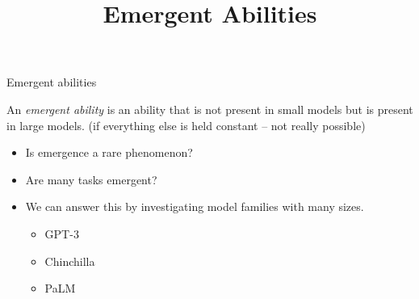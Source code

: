 



\newcommand{\learninggoals}{
\item illustrate emergent abilities that LLMs reveal when they are scaled up
\item discuss a counterargument for the concept of emergence
}

\def\myblue#1{\textcolor{texblue}{#1}}

\title{Emergent Abilities}
\date{}




\begin{vbframe}{Emergent abilities}

\vfill

An \textit{emergent ability} is an ability that is not
present in small models but is present in large models.
(if everything else is held constant -- not really possible)
\vskip3mm

\begin{itemize}
    \item Is emergence a rare phenomenon?
    \item Are many tasks emergent?
    \item We can answer this by investigating model families
    with many sizes.
    \begin{itemize}
        \item GPT-3
        \item Chinchilla
        \item PaLM
    \end{itemize}
\end{itemize}

\vfill

\end{vbframe}


